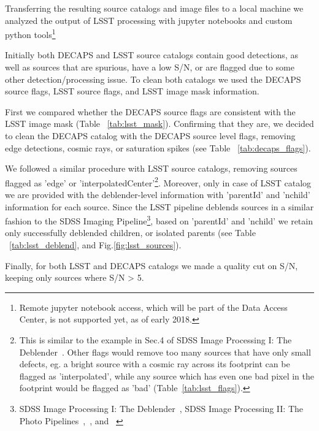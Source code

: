 \documentclass[DM,lsstdraft,toc,usenatbib]{lsstdoc}
\begin{document}
Transferring the resulting source catalogs and image files to a local machine we analyzed the output of LSST processing with jupyter notebooks and custom python tools\footnote{Remote jupyter notebook access, which will be part of the Data Access Center, is not supported yet, as of early 2018.}

Initially both DECAPS and LSST source catalogs contain good detections, as well as sources that are spurious, have a low S/N, or  are flagged due to some other detection/processing issue.  To clean both catalogs we used the DECAPS source flags, LSST source flags, and LSST image mask information.   

First we compared whether the  DECAPS source flags are consistent with the LSST image mask (Table ~\ref{tab:lsst_mask}). Confirming that they are, we decided to clean the DECAPS catalog with the DECAPS source level flags, removing edge detections, cosmic rays, or saturation spikes (see Table ~\ref{tab:decaps_flags}). 

We followed a similar procedure with LSST source catalogs, removing sources flagged as 'edge' or 'interpolatedCenter'\footnote{This is similar to the example in Sec.4 of SDSS Image Processing I: The Deblender~\citep{lupton2005}. Other flags would remove too many sources that have only small defects, eg. a bright source with a cosmic ray across its footprint can be flagged as 'interpolated',  while any source which has even one bad pixel in the footprint would be flagged as 'bad' (Table~\ref{tab:lsst_flags}). }.  Moreover, only in case of LSST catalog we are provided with the deblender-level information with 'parentId' and 'nchild' information for each source. Since the LSST pipeline deblends sources in a similar fashion to the SDSS Imaging Pipeline\footnote{SDSS Image Processing I: The Deblender~\citep{lupton2005}, SDSS Image Processing II: The Photo Pipelines~\citep{lupton2001},~\citep{lupton2002}, and ~\citep{lupton2005a}}, based on 'parentId' and 'nchild' we retain only successfully deblended children, or isolated parents (see Table ~\ref{tab:lsst_deblend}, and Fig.\ref{fig:lsst_sources}). 

Finally, for both LSST and  DECAPS catalogs we made a quality cut on S/N, keeping only sources where S/N > 5.
\end{document}
